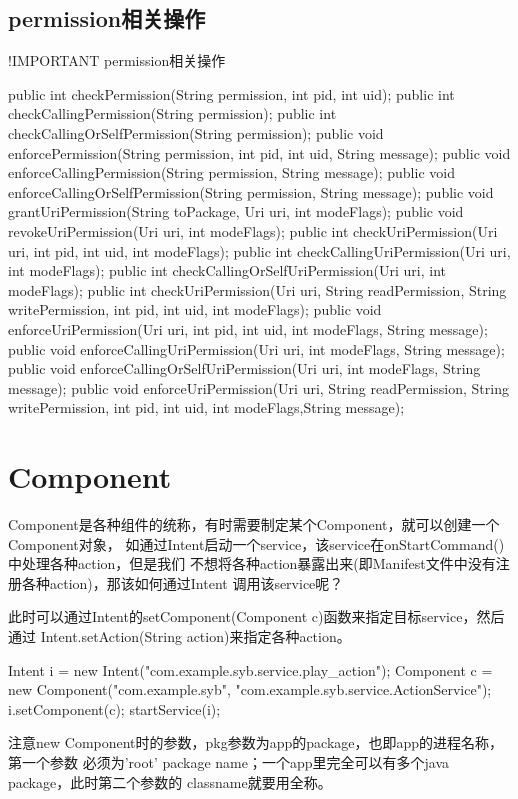 \subsection[permission相关操作]{permission相关操作}
!IMPORTANT permission相关操作

\begin{javacode}
public int checkPermission(String permission, int pid, int uid);
public int checkCallingPermission(String permission);
public int checkCallingOrSelfPermission(String permission);
public void enforcePermission(String permission, int pid, int uid, String message);
public void enforceCallingPermission(String permission, String message);
public void enforceCallingOrSelfPermission(String permission, String message);
public void grantUriPermission(String toPackage, Uri uri, int modeFlags);
public void revokeUriPermission(Uri uri, int modeFlags);
public int checkUriPermission(Uri uri, int pid, int uid, int modeFlags);
public int checkCallingUriPermission(Uri uri, int modeFlags);
public int checkCallingOrSelfUriPermission(Uri uri, int modeFlags);
public int checkUriPermission(Uri uri, String readPermission,
            String writePermission, int pid, int uid, int modeFlags);
public void enforceUriPermission(Uri uri, int pid, int uid,
            int modeFlags, String message);
public void enforceCallingUriPermission(Uri uri, int modeFlags, String message);
public void enforceCallingOrSelfUriPermission(Uri uri, int modeFlags,
            String message);
public void enforceUriPermission(Uri uri, String readPermission,
            String writePermission, int pid, int uid, int modeFlags,String message);
\end{javacode}

\section[Component]{Component}
Component是各种组件的统称，有时需要制定某个Component，就可以创建一个Component对象，
如通过Intent启动一个service，该service在onStartCommand()中处理各种action，但是我们
不想将各种action暴露出来(即Manifest文件中没有注册各种action)，那该如何通过Intent
调用该service呢？

此时可以通过Intent的setComponent(Component c)函数来指定目标service，然后通过
Intent.setAction(String action)来指定各种action。

\begin{javacode}
Intent i = new Intent("com.example.syb.service.play_action");
Component c = new Component("com.example.syb", "com.example.syb.service.ActionService");
i.setComponent(c);
startService(i);
\end{javacode}

注意new Component时的参数，pkg参数为app的package，也即app的进程名称，第一个参数
必须为'root' package name；一个app里完全可以有多个java package，此时第二个参数的
classname就要用全称。